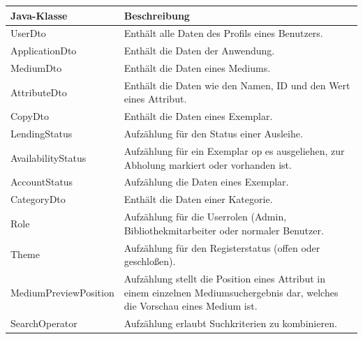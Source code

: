 \documentclass{article}
\begin{document}
\begin{center}
    \begin{table}
        \begin{tabular} { |p{}|p{}| } 
            \hline          
            Java-Klasse & Beschreibung  \\
             \hline\hline
            UserDto & Enthält alle Daten des Profils eines Benutzers. \\
            ApplicationDto & Enthält die Daten der Anwendung. \\
            \hline
            MediumDto & Enthält die Daten eines Mediums. \\
            \hline
            AttributeDto & Enthält die Daten wie den Namen, ID und den Wert eines Attribut.\\
            \hline
            CopyDto & Enthält die   Daten eines Exemplar. \\
            \hline
            LendingStatus & Aufzählung für den Status einer Ausleihe.\\
            \hline
            AvailabilityStatus & Aufzählung für ein Exemplar op es ausgeliehen, zur Abholung markiert oder vorhanden ist. \\
            \hline
            AccountStatus & Aufzählung die   Daten eines Exemplar. \\
            \hline
            CategoryDto & Enthält die Daten einer Kategorie. \\
            \hline
            Role & Aufzählung für die Userrolen  (Admin, Bibliothekmitarbeiter  oder normaler Benutzer. \\
            \hline
            Theme & Aufzählung für den Registerstatus (offen oder geschloßen). \\
            \hline
            MediumPreviewPosition & Aufzählung stellt die Position eines Attribut in einem einzelnen Mediumsuchergebnis dar, welches die Vorschau eines Medium ist. \\
            \hline
            SearchOperator & Aufzählung erlaubt Suchkriterien zu kombinieren. \\
            \hline

        \end{tabular}
        \end{table}
        \end{center}
       
\end{document}
